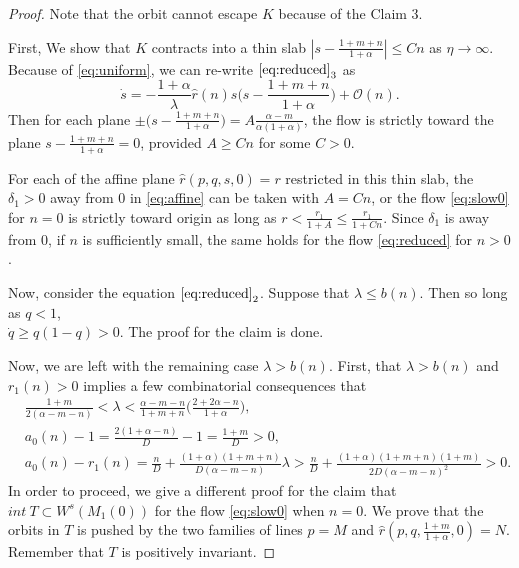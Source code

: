 \documentclass[a4paper,11pt]{article}
\begin{document}
\begin{proof}
Note that the orbit cannot escape $K$ because of the Claim 3. 

First, We show that $K$ contracts into a thin slab $|s - \frac{1+m+n}{1+\alpha}| \le Cn$ as $\eta \rightarrow \infty$. 
Because of \eqref{eq:uniform}, we can re-write $\eqref{eq:reduced}_3$ as
 $$ \dot{s} = -\frac{1+\alpha}{\lambda}\hat{r}(n)s\big(s- \frac{1+m+n}{1+\alpha}\big) + \mathcal{O}(n).$$
Then for each plane $\pm\big(s - \frac{1+m+n}{1+\alpha}\big) = A\frac{\alpha-m}{\alpha(1+\alpha)}$, the flow is strictly toward the plane $s- \frac{1+m+n}{1+\alpha}=0$, provided $A\ge Cn$ for some $C>0$. 



For each of the affine plane $\hat{r}(p,q,s,0)=r$ restricted in this thin slab, the $\delta_1>0$ away from $0$ in \eqref{eq:affine} can be taken with $A=Cn$, or the flow \eqref{eq:slow0} for $n=0$ is strictly toward origin as long as $r < \frac{r_1}{1+A} \le \frac{r_1}{1+Cn}$. Since $\delta_1$ is away from $0$, if $n$ is sufficiently small, the same holds for the flow \eqref{eq:reduced} for $n>0$.

Now, consider the equation $\eqref{eq:reduced}_2$. Suppose that $\lambda\le b(n)$. Then so long as $q<1$, \\$\dot{q} \ge q(1-q)>0$. The proof for the claim is done.

Now, we are left with the remaining case $\lambda > b(n)$. First, that $\lambda > b(n)$ and $r_1(n)>0$ implies a few combinatorial consequences that
\begin{equation}\label{eq:combi}
 \begin{aligned}
  &\frac{1+m}{2(\alpha-m-n)} < \lambda < \frac{\alpha-m-n}{1+m+n}\Big(\frac{2+2\alpha-n}{1+\alpha}\Big),\\
  &a_0(n)-1 = \frac{2(1+\alpha-n)}{D} - 1 = \frac{1+m}{D} > 0,\\
  &a_0(n)-r_1(n)= \frac{n}{D} + \frac{(1+\alpha)(1+m+n)}{D(\alpha-m-n)}\lambda >\frac{n}{D} + \frac{(1+\alpha)(1+m+n)(1+m)}{2D(\alpha-m-n)^2}>0.
 \end{aligned}
\end{equation}
In order to proceed, we give a different proof for the claim that $int~T \subset W^s(M_1(0))$ for the flow \eqref{eq:slow0} when $n=0$. We prove that the orbits in $T$ is pushed by the two families of lines $p=M$ and $\hat{r}(p,q,\frac{1+m}{1+\alpha},0)=N$. Remember that $T$ is positively invariant.


\end{proof}
\end{document}
